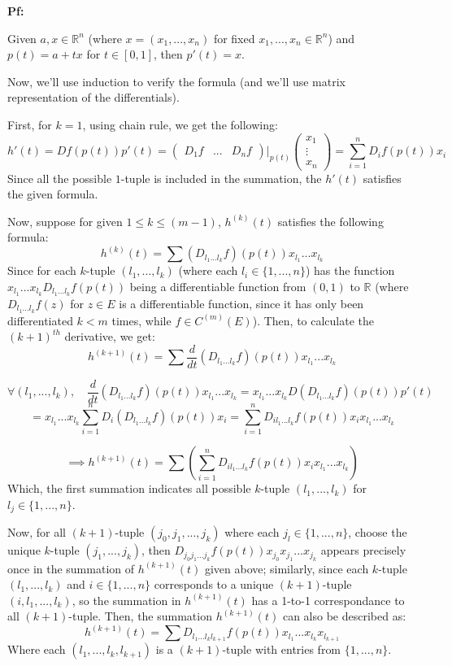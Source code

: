 \documentclass{article}
\begin{document}
\textbf{Pf:}

Given $a,x\in\mathbb{R}^n$ (where $x=(x_1,...,x_n)$ for fixed $x_1,...,x_n\in\mathbb{R}^n$) and $p(t)=a+tx$ for $t\in [0,1]$, then $p'(t)=x$.

Now, we'll use induction to verify the formula (and we'll use matrix representation of the differentials).

First, for $k=1$, using chain rule, we get the following:
$$h'(t) = Df(p(t))p'(t) = \begin{pmatrix}
    D_1f & ... & D_nf
\end{pmatrix}\bigg|_{p(t)}\begin{pmatrix}
    x_1\\\vdots\\x_n
\end{pmatrix} = \sum_{i=1}^{n}D_if(p(t))x_i$$
Since all the possible $1$-tuple is included in the summation, the $h'(t)$ satisfies the given formula.

Now, suppose for given $1\leq k\leq (m-1)$, $h^{(k)}(t)$ satisfies the following formula:
$$h^{(k)}(t) = \sum(D_{l_1...l_k}f)(p(t))x_{l_1}...x_{l_k}$$
Since for each $k$-tuple $(l_1,...,l_k)$ (where each $l_i\in \{1,...,n\}$) has the function $x_{l_1}...x_{l_k}D_{l_1...l_k}f(p(t))$ being a differentiable function from $(0,1)$ to $\mathbb{R}$ (where $D_{l_1...l_k}f(z)$ for $z\in E$ is a differentiable function, since it has only been differentiated $k<m$ times, while $f\in C^{(m)}(E)$). Then, to calculate the $(k+1)^{th}$ derivative, we get:
$$h^{(k+1)}(t) = \sum\frac{d}{dt}(D_{l_1...l_k}f)(p(t))x_{l_1}...x_{l_k}$$

$$\forall (l_1,...,l_k),\quad \frac{d}{dt}(D_{l_1...l_k}f)(p(t))x_{l_1}...x_{l_k} = x_{l_1}...x_{l_k}D\left(D_{l_1...l_k}f\right)(p(t))p'(t)$$
$$= x_{l_1}...x_{l_k}\sum_{i=1}^{n}D_i\left(D_{l_1...l_k}f\right)(p(t))x_i = \sum_{i=1}^{n}D_{il_1...l_k}f(p(t))x_ix_{l_1}...x_{l_k}$$

$$\implies h^{(k+1)}(t) = \sum\left(\sum_{i=1}^{n}D_{il_1...l_k}f(p(t))x_ix_{l_1}...x_{l_k}\right)$$
Which, the first summation indicates all possible $k$-tuple $(l_1,...,l_k)$ for $l_j\in \{1,...,n\}$.

Now, for all $(k+1)$-tuple $(j_0,j_1,...,j_k)$ where each $j_l\in \{1,...,n\}$, choose the unique $k$-tuple $(j_1,...,j_k)$, then $D_{j_0j_1...j_k}f(p(t))x_{j_0}x_{j_1}...x_{j_k}$ appears precisely once in the summation of $h^{(k+1)}(t)$ given above; similarly, since each $k$-tuple $(l_1,...,l_k)$ and $i\in\{1,...,n\}$ corresponds to a unique $(k+1)$-tuple $(i,l_1,...,l_k)$, so the summation in $h^{(k+1)}(t)$ has a 1-to-1 correspondance to all $(k+1)$-tuple. Then, the summation $h^{(k+1)}(t)$ can also be described as:
$$h^{(k+1)}(t) = \sum D_{l_1...l_kl_{k+1}}f(p(t))x_{l_1}...x_{l_k}x_{l_{k+1}}$$
Where each $(l_1,...,l_k,l_{k+1})$ is a $(k+1)$-tuple with entries from $\{1,...,n\}$.
\end{document}
